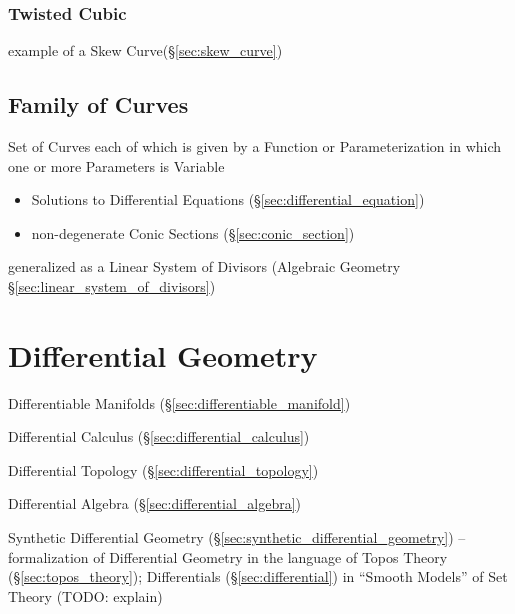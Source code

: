 \begin{itemize}
\subsubsection{Twisted Cubic}\label{sec:twisted_cubic}

example of a Skew Curve(\S\ref{sec:skew_curve})



\subsection{Family of Curves}\label{sec:curve_family}

Set of Curves each of which is given by a Function or Parameterization in which
one or more Parameters is Variable

\begin{itemize}
  \item Solutions to Differential Equations (\S\ref{sec:differential_equation})
  \item non-degenerate Conic Sections (\S\ref{sec:conic_section})
\end{itemize}

\fist generalized as a Linear System of Divisors (Algebraic Geometry
\S\ref{sec:linear_system_of_divisors})



\section{Differential Geometry}\label{sec:differential_geometry}

Differentiable Manifolds (\S\ref{sec:differentiable_manifold})

\fist Differential Calculus (\S\ref{sec:differential_calculus})

\fist Differential Topology (\S\ref{sec:differential_topology})

\fist Differential Algebra (\S\ref{sec:differential_algebra})

\fist Synthetic Differential Geometry
(\S\ref{sec:synthetic_differential_geometry}) -- formalization of Differential
Geometry in the language of Topos Theory (\S\ref{sec:topos_theory});
Differentials (\S\ref{sec:differential}) in ``Smooth Models'' of Set Theory
(TODO: explain)




\end{itemize}
